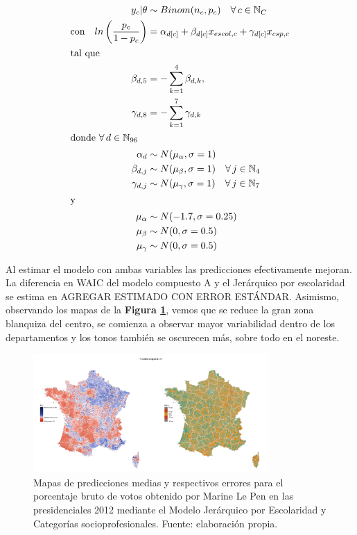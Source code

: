\begin{align}\label{eq:Modelo_Comp_A}
y_c|\theta & \sim Binom(n_c,p_c) \quad \forall \, c \in \mathbb{N}_C \nonumber \\
\text{con} \quad ln\left(\dfrac{p_c}{1-p_c}\right) &= \alpha_{d[c]} + \beta_{d[c]} x_{escol,c} + \gamma_{d[c]} x_{csp,c} \\ 
\intertext{tal que} 
\beta_{d,5} &= -\sum\limits_{k = 1}^{4} \beta_{d,k}, \nonumber \\
\gamma_{d,8} &= -\sum\limits_{k = 1}^{7} \gamma_{d,k} \nonumber \\
\intertext{donde $\forall \, d \in \mathbb{N}_{96}$}
\alpha_d & \sim N(\mu_{\alpha}, \sigma=1) \quad  \nonumber \\
\beta_{d,j} & \sim N(\mu_{\beta}, \sigma=1) \quad \forall \, j \in \mathbb{N}_{4} \nonumber \\
\gamma_{d,j} & \sim N(\mu_{\gamma}, \sigma=1) \quad \forall \, j \in \mathbb{N}_{7} \nonumber \\
\intertext{y}
\mu_{\alpha} &\sim N(-1.7,\sigma=0.25) \nonumber \\
\mu_{\beta} &\sim N(0,\sigma=0.5) \nonumber \\
\mu_{\gamma} &\sim N(0,\sigma=0.5) \nonumber
\end{align}

Al estimar el modelo con ambas variables las predicciones efectivamente mejoran. La diferencia en WAIC del modelo compuesto A y el Jerárquico por escolaridad se estima en {\color{Red} AGREGAR ESTIMADO CON ERROR ESTÁNDAR}. Asimismo, observando los mapas de la \textbf{Figura \ref{fig:Modelo_Compuesto_A}}, vemos que se reduce la gran zona blanquiza del centro, se comienza a observar mayor variabilidad dentro de los departamentos y los tonos también se oscurecen más, sobre todo en el noreste.\\ 

\begin{figure}[h]
	\centering
	\includegraphics[width = 0.8\textwidth]{Figs/Modelado/Modelo_Compuesto_A}
	\caption{Mapas de predicciones medias y respectivos errores para el porcentaje bruto de votos obtenido por Marine Le Pen en las presidenciales 2012 mediante el Modelo Jerárquico por Escolaridad y Categorías socioprofesionales. Fuente: elaboración propia.}
	\label{fig:Modelo_Compuesto_A}
\end{figure}

